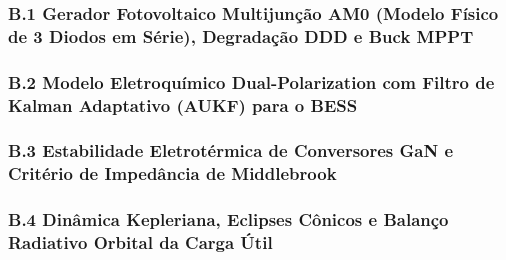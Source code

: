 \vspace{0.6cm}
\subsubsection*{B.1 Gerador Fotovoltaico Multijunção AM0 (Modelo Físico de 3 Diodos em Série), Degradação DDD e Buck MPPT}


\vspace{0.6cm}
\subsubsection*{B.2 Modelo Eletroquímico Dual-Polarization com Filtro de Kalman Adaptativo (AUKF) para o BESS}


\vspace{0.6cm}
\subsubsection*{B.3 Estabilidade Eletrotérmica de Conversores GaN e Critério de Impedância de Middlebrook}


\vspace{0.6cm}
\subsubsection*{B.4 Dinâmica Kepleriana, Eclipses Cônicos e Balanço Radiativo Orbital da Carga Útil}


